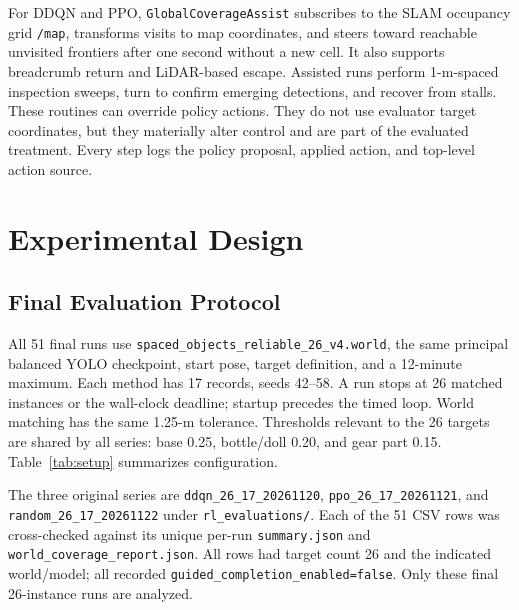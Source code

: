 \documentclass[conference]{IEEEtran}
\begin{document}
For DDQN and PPO, \texttt{GlobalCoverageAssist} subscribes to the SLAM occupancy grid \texttt{/map}, transforms visits to map coordinates, and steers toward reachable unvisited frontiers after one second without a new cell. It also supports breadcrumb return and LiDAR-based escape. Assisted runs perform 1-m-spaced inspection sweeps, turn to confirm emerging detections, and recover from stalls. These routines can override policy actions. They do not use evaluator target coordinates, but they materially alter control and are part of the evaluated treatment. Every step logs the policy proposal, applied action, and top-level action source.

\section{Experimental Design}
\subsection{Final Evaluation Protocol}
All 51 final runs use \texttt{spaced\_objects\_reliable\_26\_v4.world}, the same principal balanced YOLO checkpoint, start pose, target definition, and a 12-minute maximum. Each method has 17 records, seeds 42--58. A run stops at 26 matched instances or the wall-clock deadline; startup precedes the timed loop. World matching has the same 1.25-m tolerance. Thresholds relevant to the 26 targets are shared by all series: base 0.25, bottle/doll 0.20, and gear part 0.15. Table~\ref{tab:setup} summarizes configuration.

The three original series are \texttt{ddqn\_26\_17\_20261120}, \texttt{ppo\_26\_17\_20261121}, and \texttt{random\_26\_17\_20261122} under \texttt{rl\_evaluations/}. Each of the 51 CSV rows was cross-checked against its unique per-run \texttt{summary.json} and \texttt{world\_coverage\_report.json}. All rows had target count 26 and the indicated world/model; all recorded \texttt{guided\_completion\_enabled=false}. Only these final 26-instance runs are analyzed.
\end{document}
